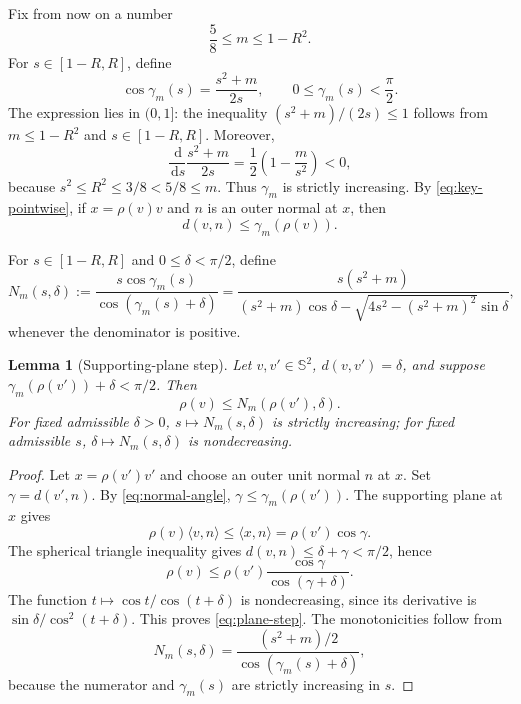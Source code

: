 \documentclass[11pt,reqno]{amsart}
\numberwithin{equation}{section}
\newtheorem{lemma}[theorem]{Lemma}
\theoremstyle{definition}
\theoremstyle{remark}
\newcommand{\Sph}{\mathbb{S}^{2}}
\newcommand{\dd}{\,\mathrm{d}}
\newcommand{\ip}[2]{\langle #1,#2\rangle}
\begin{document}
Fix from now on a number
\begin{equation}\label{eq:m-range}
 \frac58\leq m\leq1-R^{2}.
\end{equation}
For $s\in[1-R,R]$, define
\begin{equation}\label{eq:gamma-max}
 \cos\gamma_m(s)=\frac{s^{2}+m}{2s},
 \qquad 0\leq\gamma_m(s)<\frac\pi2.
\end{equation}
The expression lies in $(0,1]$: the inequality $(s^{2}+m)/(2s)\leq1$ follows from $m\leq1-R^{2}$ and $s\in[1-R,R]$. Moreover,
\[
 \frac{\dd}{\dd s}\frac{s^{2}+m}{2s}=\frac12\left(1-\frac{m}{s^{2}}\right)<0,
\]
because $s^{2}\leq R^{2}\leq3/8<5/8\leq m$. Thus $\gamma_m$ is strictly increasing. By \eqref{eq:key-pointwise}, if $x=\rho(v)v$ and $n$ is an outer normal at $x$, then
\begin{equation}\label{eq:normal-angle}
 d(v,n)\leq\gamma_m(\rho(v)).
\end{equation}

For $s\in[1-R,R]$ and $0\leq\delta<\pi/2$, define
\begin{equation}\label{eq:N-def}
 N_m(s,\delta)
 :=\frac{s\cos\gamma_m(s)}{\cos(\gamma_m(s)+\delta)}
 =\frac{s(s^{2}+m)}{(s^{2}+m)\cos\delta-
 \sqrt{4s^{2}-(s^{2}+m)^{2}}\sin\delta},
\end{equation}
whenever the denominator is positive.

\begin{lemma}[Supporting-plane step]\label{lem:plane-step}
Let $v,v'\in\Sph$, $d(v,v')=\delta$, and suppose
$\gamma_m(\rho(v'))+\delta<\pi/2$. Then
\begin{equation}\label{eq:plane-step}
 \rho(v)\leq N_m(\rho(v'),\delta).
\end{equation}
For fixed admissible $\delta>0$, $s\mapsto N_m(s,\delta)$ is strictly increasing; for fixed admissible $s$, $\delta\mapsto N_m(s,\delta)$ is nondecreasing.
\end{lemma}

\begin{proof}
Let $x=\rho(v')v'$ and choose an outer unit normal $n$ at $x$. Set $\gamma=d(v',n)$. By \eqref{eq:normal-angle}, $\gamma\leq\gamma_m(\rho(v'))$. The supporting plane at $x$ gives
\[
 \rho(v)\ip{v}{n}\leq\ip{x}{n}=\rho(v')\cos\gamma.
\]
The spherical triangle inequality gives $d(v,n)\leq\delta+\gamma<\pi/2$, hence
\[
 \rho(v)\leq\rho(v')\frac{\cos\gamma}{\cos(\gamma+\delta)}.
\]
The function $t\mapsto\cos t/\cos(t+\delta)$ is nondecreasing, since its derivative is $\sin\delta/\cos^{2}(t+\delta)$. This proves \eqref{eq:plane-step}. The monotonicities follow from
\[
 N_m(s,\delta)=\frac{(s^{2}+m)/2}{\cos(\gamma_m(s)+\delta)},
\]
because the numerator and $\gamma_m(s)$ are strictly increasing in $s$.
\end{proof}
\end{document}
